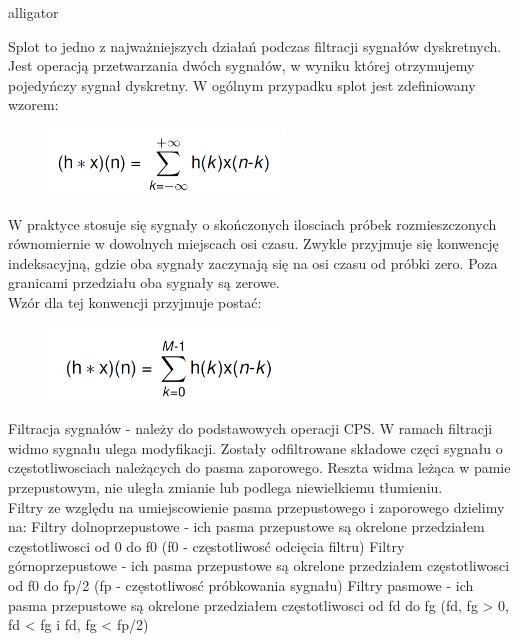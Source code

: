 \documentclass[12pt]{article}
\begin{document}
\begin{labeling}{alligator}


\item [Splot] to jedno z najważniejszych działań podczas filtracji sygnałów dyskretnych. Jest operacją przetwarzania dwóch sygnałów, w wyniku której otrzymujemy pojedyńczy sygnał dyskretny.  W ogólnym przypadku splot jest zdefiniowany wzorem:
\begin{figure}[h!]
 \centering
 \includegraphics[width=6.3cm]{splotWO.PNG}
 \vspace{-0.3cm}
 \label{Widok_aplikacjis}
\end{figure}
W praktyce stosuje się sygnały o skończonych ilosciach próbek rozmieszczonych równomiernie w dowolnych miejscach osi czasu. Zwykle przyjmuje się konwencję indeksacyjną, gdzie oba sygnały zaczynają się  na osi czasu od próbki zero. Poza granicami przedziału oba sygnały są zerowe. 
\\Wzór dla tej konwencji przyjmuje postać: 
\begin{figure}[h!]
 \centering
 \includegraphics[width=6.3cm]{splotWS.PNG}
 \vspace{-0.3cm}
 \label{Splot_indeks}
\end{figure}


\item [Filtracja sygnałów]  - należy do podstawowych operacji CPS. W ramach filtracji widmo sygnału ulega modyfikacji. Zostały odfiltrowane składowe częci sygnału o częstotliwosciach należących do pasma zaporowego. Reszta widma leżąca w pamie przepustowym, nie uległa zmianie lub podlega niewielkiemu tłumieniu. 
\\Filtry ze względu na umiejscowienie pasma przepustowego i zaporowego dzielimy na:
\subitem Filtry dolnoprzepustowe - ich pasma przepustowe są okrelone przedziałem częstotliwosci od 0 do f0 (f0 - częstotliwosć odcięcia filtru) 
\subitem Filtry górnoprzepustowe - ich pasma przepustowe są okrelone przedziałem częstotliwosci od f0 do fp/2 (fp - częstotliwosć próbkowania sygnału) 
\subitem Filtry pasmowe - ich pasma przepustowe są okrelone przedziałem częstotliwosci od fd do fg (fd, fg > 0, fd < fg i fd, fg < fp/2) 


\end{labeling}
\end{document}
